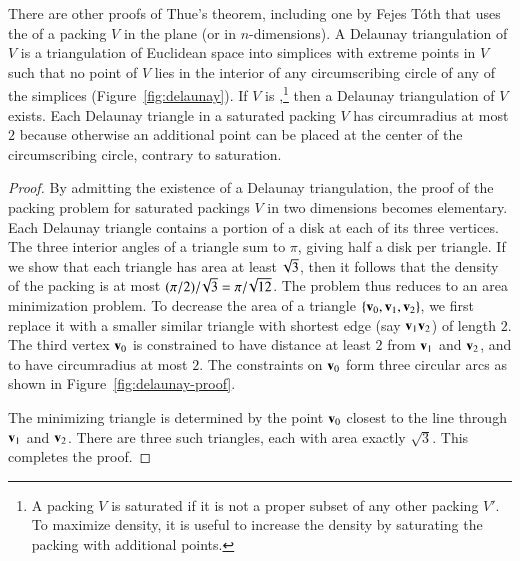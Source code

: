 
\bigskip

%

There are other proofs of Thue's theorem, including one by Fejes
T\'oth that uses the  
of a packing $V$
in the plane (or in $n$-dimensions).  A Delaunay triangulation of $V$
is a triangulation of Euclidean space into simplices with extreme
points in $V$ such that no point of $V$ lies in the interior of any
circumscribing circle of any of the simplices (Figure~\ref{fig:delaunay}).  
If $V$ is
,\footnote{A packing $V$ is saturated if it is not
  a proper subset of any other packing $V'$.  To maximize density, it
  is useful to increase the density by saturating the packing with
  additional points.} then a Delaunay triangulation of
$V$ exists.  Each Delaunay triangle in a saturated packing $V$ has
circumradius at most $2$ because otherwise an additional point can be
placed at the center of the circumscribing circle, contrary to saturation.

\figANNTKZP %

\begin{proof}
  By admitting the existence of a Delaunay triangulation, the proof of
  the packing problem for saturated packings $V$ in two dimensions becomes
  elementary.  Each Delaunay triangle contains a portion of a disk at each of
  its three vertices.  The three interior angles of a triangle sum to
  $\pi$, giving half a disk per triangle.  If we show that each triangle has area
  at least $\!\sqrt{3}$, then it follows that the density of the packing is at most
  $(\pi/2)/\!\sqrt{3} = \pi/\!\sqrt{12}$.  The problem thus reduces to
  an area minimization problem.  To decrease the area of a triangle
  $\{{\mathbf v}_0,{\mathbf v}_1,{\mathbf v}_2\}$, we first replace it with a smaller similar
  triangle with shortest edge (say ${\mathbf v}_1{\mathbf v}_2$) of length $2$.  The
  third vertex ${\mathbf v}_0$ is constrained to have distance at least $2$
  from ${\mathbf v}_1$ and ${\mathbf v}_2$, and to have circumradius at most $2$.  The
  constraints on ${\mathbf v}_0$ form three circular arcs as shown in
  Figure~\ref{fig:delaunay-proof}.

\figCCKQLLH  %


The minimizing triangle is determined by the point ${\mathbf v}_0$ closest to
the line through ${\mathbf v}_1$ and ${\mathbf v}_2$.  There are three such triangles,
each with area exactly $\sqrt3$.  This completes the proof.
\end{proof}

